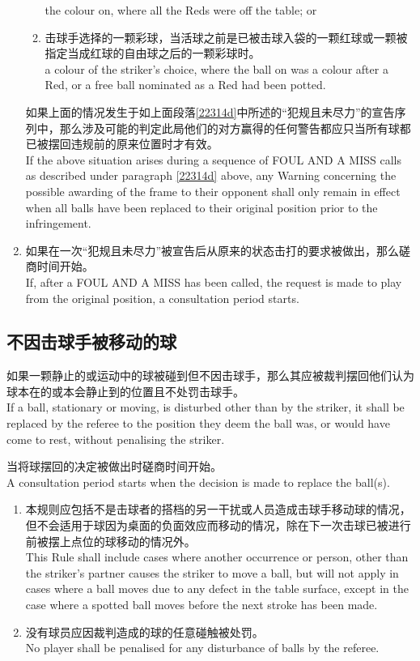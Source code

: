 \begin{enumerate}[label=(\alph*)]
\begin{enumerate}[label=(\roman*)]
        the colour on, where all the Reds were off the table; or
        \item 击球手选择的一颗彩球，当活球之前是已被击球入袋的一颗红球或一颗被指定当成红球的自由球之后的一颗彩球时。\\
        a colour of the striker's choice, where the ball on was a colour after a Red, or a free ball nominated as a Red had been potted.
    \end{enumerate}
    如果上面的情况发生于如上面段落\ref{22314d}中所述的``犯规且未尽力''的宣告序列中，那么涉及可能的判定此局他们的对方赢得的任何警告都应只当所有球都已被摆回违规前的原来位置时才有效。\\
    If the above situation arises during a sequence of FOUL AND A MISS calls as described under paragraph \ref{22314d} above, any Warning concerning the possible awarding of the frame to their opponent shall only remain in effect when all balls have been replaced to their original position prior to the infringement.
    \item 如果在一次``犯规且未尽力''被宣告后从原来的状态击打的要求被做出，那么磋商时间开始。\\
    If, after a FOUL AND A MISS has been called, the request is made to play from the original position, a consultation period starts.
\end{enumerate}

\subsection{不因击球手被移动的球}\label{22315}

\noindent 如果一颗静止的或运动中的球被碰到但不因击球手，那么其应被裁判摆回他们认为球本在的或本会静止到的位置且不处罚击球手。\\
If a ball, stationary or moving, is disturbed other than by the striker, it shall be replaced by the referee to the position they deem the ball was, or would have come to rest, without penalising the striker.

\noindent 当将球摆回的决定被做出时磋商时间开始。\\
A consultation period starts when the decision is made to replace the ball(s).
\begin{enumerate}[label=(\alph*)]
    \item 本规则应包括不是击球者的搭档的另一干扰或人员造成击球手移动球的情况，但不会适用于球因为桌面的负面效应而移动的情况，除在下一次击球已被进行前被摆上点位的球移动的情况外。\\
    This Rule shall include cases where another occurrence or person, other than the striker's partner causes the striker to move a ball, but will not apply in cases where a ball moves due to any defect in the table surface, except in the case where a spotted ball moves before the next stroke has been made.
    \item 没有球员应因裁判造成的球的任意碰触被处罚。\\
    No player shall be penalised for any disturbance of balls by the referee.
\end{enumerate}

